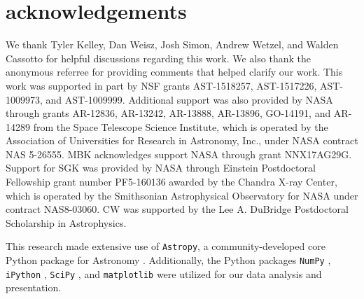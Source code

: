\documentclass[usenatbib]{mnras}
\begin{document}
\section*{acknowledgements} 
%
We thank Tyler Kelley, Dan Weisz, Josh Simon, Andrew Wetzel, and
Walden Cassotto for helpful discussions regarding this work.
We also thank the anonymous referree for providing comments that
helped clarify our work.
%
This work was supported in part by NSF grants AST-1518257,
AST-1517226, AST-1009973, and AST-1009999.
%
Additional support was also provided by NASA through grants AR-12836,
AR-13242, AR-13888, AR-13896, GO-14191, and AR-14289 from the Space Telescope
Science Institute, which is operated by the Association of Universities for
Research in Astronomy, Inc., under NASA contract NAS 5-26555.
%
MBK acknowledges support NASA through grant
NNX17AG29G.
%
Support for SGK was provided by NASA through Einstein Postdoctoral
Fellowship grant number PF5-160136 awarded by the Chandra X-ray
Center, which is operated by the Smithsonian Astrophysical Observatory
for NASA under contract NAS8-03060.
%
CW was supported by the Lee A. DuBridge Postdoctoral Scholarship in
Astrophysics. 
%


This research made extensive use of {\texttt{Astropy}},
a community-developed core Python package for Astronomy
\citep{astropy13}.
Additionally, the Python packages {\texttt{NumPy}} \citep{numpy},
{\texttt{iPython}} \citep{ipython}, {\texttt{SciPy}} \citep{scipy}, and
{\texttt{matplotlib}} \citep{matplotlib} were utilized for our data
analysis and presentation. 





\label{lastpage}
\end{document}
